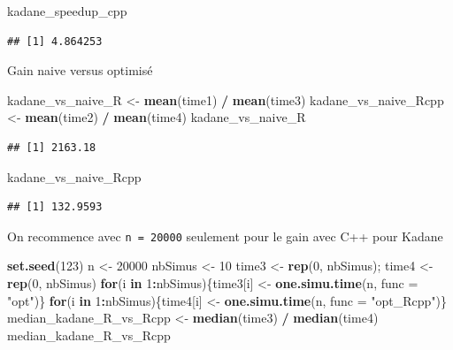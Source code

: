 \documentclass[
]{article}
\newenvironment{Shaded}{\begin{snugshade}}{\end{snugshade}}
\newcommand{\AttributeTok}[1]{\textcolor[rgb]{0.13,0.29,0.53}{#1}}
\newcommand{\ControlFlowTok}[1]{\textcolor[rgb]{0.13,0.29,0.53}{\textbf{#1}}}
\newcommand{\DecValTok}[1]{\textcolor[rgb]{0.00,0.00,0.81}{#1}}
\newcommand{\FunctionTok}[1]{\textcolor[rgb]{0.13,0.29,0.53}{\textbf{#1}}}
\newcommand{\NormalTok}[1]{#1}
\newcommand{\OtherTok}[1]{\textcolor[rgb]{0.56,0.35,0.01}{#1}}
\newcommand{\SpecialCharTok}[1]{\textcolor[rgb]{0.81,0.36,0.00}{\textbf{#1}}}
\newcommand{\StringTok}[1]{\textcolor[rgb]{0.31,0.60,0.02}{#1}}
\begin{document}
\begin{Shaded}
\begin{Highlighting}[]
\NormalTok{kadane\_speedup\_cpp}
\end{Highlighting}
\end{Shaded}

\begin{verbatim}
## [1] 4.864253
\end{verbatim}

Gain naive versus optimisé

\begin{Shaded}
\begin{Highlighting}[]
\NormalTok{kadane\_vs\_naive\_R }\OtherTok{\textless{}{-}} \FunctionTok{mean}\NormalTok{(time1) }\SpecialCharTok{/} \FunctionTok{mean}\NormalTok{(time3)}
\NormalTok{kadane\_vs\_naive\_Rcpp }\OtherTok{\textless{}{-}} \FunctionTok{mean}\NormalTok{(time2) }\SpecialCharTok{/} \FunctionTok{mean}\NormalTok{(time4)}
\NormalTok{kadane\_vs\_naive\_R}
\end{Highlighting}
\end{Shaded}

\begin{verbatim}
## [1] 2163.18
\end{verbatim}

\begin{Shaded}
\begin{Highlighting}[]
\NormalTok{kadane\_vs\_naive\_Rcpp}
\end{Highlighting}
\end{Shaded}

\begin{verbatim}
## [1] 132.9593
\end{verbatim}

On recommence avec \texttt{n\ =\ 20000} seulement pour le gain avec C++
pour Kadane

\begin{Shaded}
\begin{Highlighting}[]
\FunctionTok{set.seed}\NormalTok{(}\DecValTok{123}\NormalTok{)}
\NormalTok{n }\OtherTok{\textless{}{-}} \DecValTok{20000}
\NormalTok{nbSimus }\OtherTok{\textless{}{-}} \DecValTok{10}
\NormalTok{time3 }\OtherTok{\textless{}{-}} \FunctionTok{rep}\NormalTok{(}\DecValTok{0}\NormalTok{, nbSimus); time4 }\OtherTok{\textless{}{-}} \FunctionTok{rep}\NormalTok{(}\DecValTok{0}\NormalTok{, nbSimus)}
\ControlFlowTok{for}\NormalTok{(i }\ControlFlowTok{in} \DecValTok{1}\SpecialCharTok{:}\NormalTok{nbSimus)\{time3[i] }\OtherTok{\textless{}{-}} \FunctionTok{one.simu.time}\NormalTok{(n, }\AttributeTok{func =} \StringTok{"opt"}\NormalTok{)\}}
\ControlFlowTok{for}\NormalTok{(i }\ControlFlowTok{in} \DecValTok{1}\SpecialCharTok{:}\NormalTok{nbSimus)\{time4[i] }\OtherTok{\textless{}{-}} \FunctionTok{one.simu.time}\NormalTok{(n, }\AttributeTok{func =} \StringTok{"opt\_Rcpp"}\NormalTok{)\}}
\NormalTok{median\_kadane\_R\_vs\_Rcpp }\OtherTok{\textless{}{-}} \FunctionTok{median}\NormalTok{(time3) }\SpecialCharTok{/} \FunctionTok{median}\NormalTok{(time4)}
\NormalTok{median\_kadane\_R\_vs\_Rcpp}
\end{Highlighting}
\end{Shaded}
\end{document}
